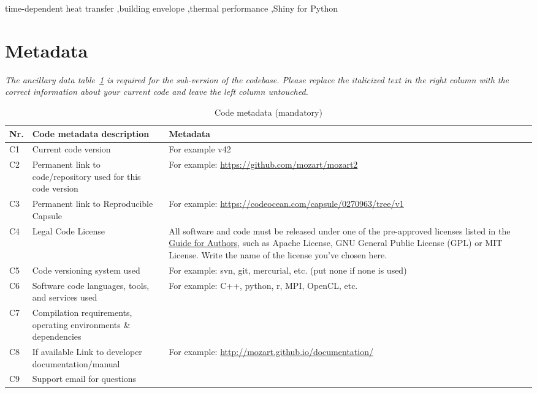 \documentclass[preprint,12pt, a4paper]{elsarticle}
\begin{document}
\begin{frontmatter}
\begin{keyword}
time-dependent heat transfer \sep building envelope \sep thermal performance \sep Shiny for Python



\end{keyword}

\end{frontmatter}


\section*{Metadata}
\label{}
\textit{The ancillary data table~\ref{codeMetadata} is required for the sub-version of the codebase. Please replace the italicized text in the right column with the correct information about your current code and leave the left column untouched.}

\begin{table}[!h]
\begin{tabular}{|l|p{6.5cm}|p{6.5cm}|}
\hline
\textbf{Nr.} & \textbf{Code metadata description} & \textbf{Metadata} \\
\hline
C1 & Current code version & For example v42 \\
\hline
C2 & Permanent link to code/repository used for this code version & For example: \url{https://github.com/mozart/mozart2} \\
\hline
C3  & Permanent link to Reproducible Capsule & For example: \url{https://codeocean.com/capsule/0270963/tree/v1}\\
\hline
C4 & Legal Code License   & All software and code must be released under one of the pre-approved licenses listed in the \href{https://www.elsevier.com/journals/softwarex/2352-7110/guide-for-authors}{Guide for Authors}, such as Apache License, GNU General Public License (GPL) or MIT License. Write the name of the license you’ve chosen here. \\
\hline
C5 & Code versioning system used & For example: svn, git, mercurial,
                                   etc. (put none if none is used) \\
\hline
C6 & Software code languages, tools, and services used & For example: C++, python, r, MPI, OpenCL, etc. \\
\hline
C7 & Compilation requirements, operating environments \& dependencies & \\
\hline
C8 & If available Link to developer documentation/manual & For example: \url{http://mozart.github.io/documentation/} \\
\hline
C9 & Support email for questions & \\
\hline
\end{tabular}
\caption{Code metadata (mandatory)}
\label{codeMetadata} 
\end{table}
\end{document}
